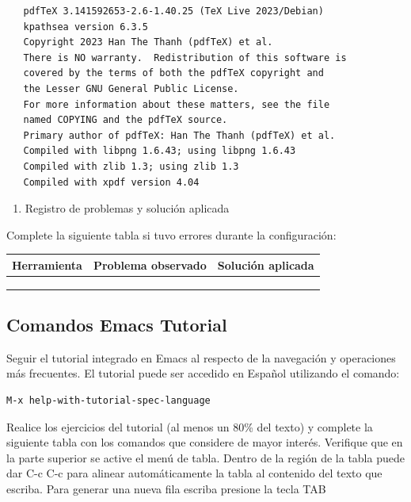 \documentclass{article}
\begin{document}
\begin{verbatim}
   pdfTeX 3.141592653-2.6-1.40.25 (TeX Live 2023/Debian)
   kpathsea version 6.3.5
   Copyright 2023 Han The Thanh (pdfTeX) et al.
   There is NO warranty.  Redistribution of this software is
   covered by the terms of both the pdfTeX copyright and
   the Lesser GNU General Public License.
   For more information about these matters, see the file
   named COPYING and the pdfTeX source.
   Primary author of pdfTeX: Han The Thanh (pdfTeX) et al.
   Compiled with libpng 1.6.43; using libpng 1.6.43
   Compiled with zlib 1.3; using zlib 1.3
   Compiled with xpdf version 4.04
\end{verbatim}


\begin{enumerate}
\item Registro de problemas y solución aplicada
\end{enumerate}

Complete la siguiente tabla si tuvo errores durante la configuración:

\begin{center}
\begin{tabularx}{\textwidth}{lXX}
\textbf{Herramienta} & \textbf{Problema observado} & \textbf{Solución aplicada}\\[0pt]
\hline
 &  & \\[0pt]
 &  & \\[0pt]
 &  & \\[0pt]
\end{tabularx}
\end{center}

\subsection{Comandos Emacs Tutorial}
\label{sec:orgb1a9564}
Seguir el tutorial integrado en Emacs al respecto de la navegación y
operaciones más frecuentes. El tutorial puede ser accedido en Español
utilizando el comando:
\begin{verbatim}
M-x help-with-tutorial-spec-language
\end{verbatim}

Realice los ejercicios del tutorial (al menos un 80\% del texto) y
complete la siguiente tabla con los comandos que considere de mayor
interés. Verifique que en la parte superior se active el menú de
tabla. Dentro de la región de la tabla puede dar C-c C-c para alinear
automáticamente la tabla al contenido del texto que escriba. Para
generar una nueva fila escriba presione la tecla TAB
\end{document}
